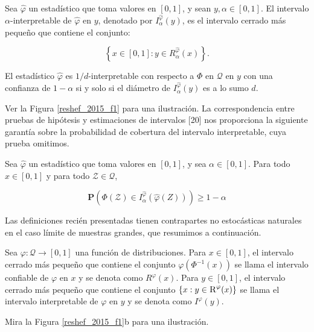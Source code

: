 	\begin{defn}
		Sea $\hat{\varphi}$ un estad\'istico que toma valores en $[0,1]$, y sean $y, \alpha \in [0,1]$. El intervalo $\alpha$-interpretable de $\hat{\varphi}$ en $y$, denotado por $I_\alpha^{\hat{\varphi}}(y)$, es el intervalo cerrado m\'as peque\~no que contiene el conjunto:

		$$
		\left\{x \in[0,1]: y \in R_\alpha^{\hat{\varphi}}(x)\right\} .
		$$

		El estad\'istico $\hat{\varphi}$ es $1/d$-interpretable con respecto a $\Phi$ en $\mathcal{Q}$ en $y$ con una confianza de $1-\alpha$ si y solo si el di\'ametro de $I_\alpha^{\hat{\varphi}}(y)$ es a lo sumo $d$.
		\label{interpretabilidad}
	\end{defn}

	Ver la Figura \ref{reshef_2015_f1} para una ilustraci\'on. La correspondencia entre pruebas de hip\'otesis y estimaciones de intervalos [20] nos proporciona la siguiente garant\'ia sobre la probabilidad de cobertura del intervalo interpretable, cuya prueba omitimos.

	\begin{prop}
		Sea $\hat{\varphi}$ un estad\'istico que toma valores en $[0,1]$, y sea $\alpha \in [0,1]$. Para todo $x \in [0,1]$ y para todo $\mathcal{Z} \in \mathcal{Q}$,

		$$
		\mathbf{P}\left(\Phi(\mathcal{Z}) \in I_\alpha^{\hat{\varphi}}(\hat{\varphi}(Z))\right) \geq 1-\alpha
		$$
	\end{prop}

	Las definiciones reci\'en presentadas tienen contrapartes no estoc\'asticas naturales en el caso l\'imite de muestras grandes, que resumimos a continuaci\'on.

	\begin{defn}
		Sea $\varphi:\mathcal{Q} \rightarrow [0,1]$ una funci\'on de distribuciones. Para $x \in [0,1]$, el intervalo cerrado m\'as peque\~no que contiene el conjunto $\varphi\left(\Phi^{-1}({x})\right)$ se llama el intervalo confiable de $\varphi$ en $x$ y se denota como $R^{\varphi}(x)$. Para $y \in [0,1]$, el intervalo cerrado m\'as peque\~no que contiene el conjunto $\left\{ x: y \in \textsc{R}^{\varphi} (x) \right\}$ se llama el intervalo interpretable de $\varphi$ en $y$ y se denota como $I^{\varphi}(y)$.

	\end{defn}

	Mira la Figura \ref{reshef_2015_f1}b para una ilustraci\'on.

